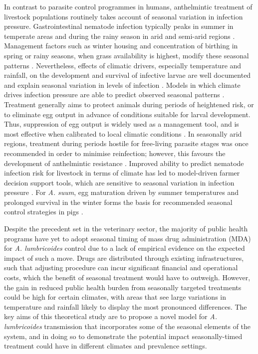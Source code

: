 In contrast to parasite control programmes in humans, anthelmintic treatment of livestock populations routinely takes account of seasonal variation in infection pressure. Gastrointestinal nematode infection typically peaks in summer in temperate areas \cite{Sissay} and during the rainy season in arid and semi-arid regions \cite{Morgan}. Management factors such as winter housing and concentration of birthing in spring or rainy seasons, when grass availability is highest, modify these seasonal patterns \cite{Charlier}. Nevertheless, effects of climatic drivers, especially temperature and rainfall, on the development and survival of infective larvae are well documented \cite{OConnor2006} and explain seasonal variation in levels of infection \cite{Roberts}. Models in which climate drives infection pressure are able to predict observed seasonal patterns \cite{Kao,Bolajoko,Rose}. Treatment generally aims to protect animals during periods of heightened risk, or to eliminate egg output in advance of conditions suitable for larval development. Thus, suppression of egg output is widely used as a management tool, and is most effective when calibrated to local climatic conditions \cite{Charlier2014,Dever}. In seasonally arid regions, treatment during periods hostile for free-living parasite stages was once recommended in order to minimise reinfection; however, this favours the development of anthelmintic resistance \cite{Cornelius}. Improved ability to predict nematode infection risk for livestock in terms of climate has led to model-driven farmer decision support tools, which are sensitive to seasonal variation in infection pressure \cite{Learmount,Verschave}. For \textit{A. suum}, egg maturation driven by summer temperatures and prolonged survival in the winter forms the basis for recommended seasonal control strategies in pigs \cite{Larsen}. 

Despite the precedent set in the veterinary sector, the majority of public health programs have yet to adopt seasonal timing of mass drug administration (MDA) for \textit{A. lumbricoides} control due to a lack of empirical evidence on the expected impact of such a move. Drugs are distributed through existing infrastructures, such that adjusting procedure can incur significant financial and operational costs, which the benefit of seasonal treatment would have to outweigh. However, the gain in reduced public health burden from seasonally targeted treatments could be high for certain climates, with areas that see large variations in temperature and rainfall likely to display the most pronounced differences. The key aims of this theoretical study are to propose a novel model for \textit{A. lumbricoides} transmission that incorporates some of the seasonal elements of the system, and in doing so to demonstrate the potential impact seasonally-timed treatment could have in different climates and prevalence settings. 

